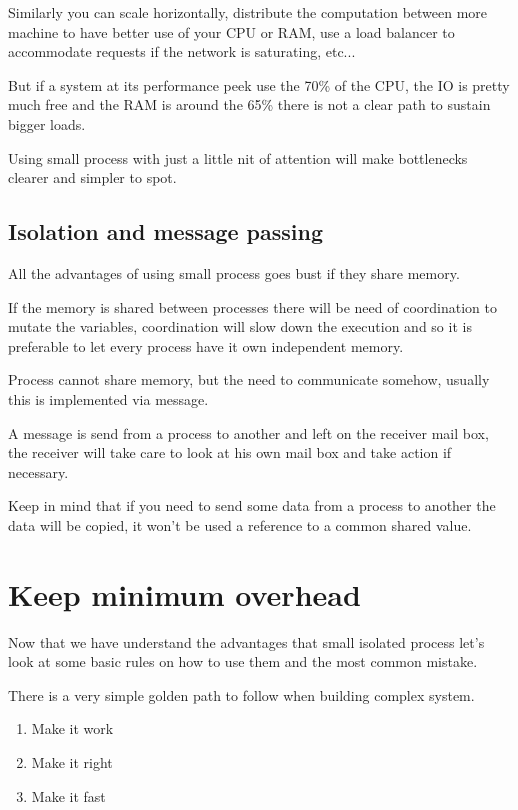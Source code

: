 \documentclass[12pt]{article} %
\begin{document}
Similarly you can scale horizontally, distribute the computation between more machine to have better use of your CPU or RAM, use a load balancer to accommodate requests if the network is saturating, etc...

But if a system at its performance peek use the 70\% of the CPU, the IO is pretty much free and the RAM is around the 65\% there is not a clear path to sustain bigger loads.

Using small process with just a little nit of attention will make bottlenecks clearer and simpler to spot.

	\subsection{Isolation and message passing}
	
All the advantages of using small process goes bust if they share memory.

If the memory is shared between processes there will be need of coordination to mutate the variables, coordination will slow down the execution and so it is preferable to let every process have it own independent memory.

Process cannot share memory, but the need to communicate somehow, usually this is implemented via message.

A message is send from a process to another and left on the receiver mail box, the receiver will take care to look at his own mail box and take action if necessary.

Keep in mind that if you need to send some data from a process to another the data will be copied, it won't be used a reference to a common shared value.

\section{Keep minimum overhead}

Now that we have understand the advantages that small isolated process let's look at some basic rules on how to use them and the most common mistake.

There is a very simple golden path to follow when building complex system.

\begin{enumerate}
	\item Make it work
	\item Make it right
	\item Make it fast
\end{enumerate}
\end{document}
